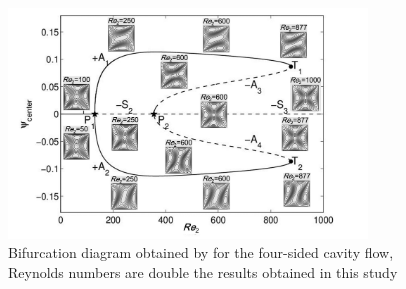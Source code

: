 \begin{figure}[h!]
  \centering
  \includegraphics[width=0.85\textwidth]{figs/fig2_chen2013.png}
  \caption{Bifurcation diagram obtained by \cite{chen2013} for the
   four-sided cavity flow, Reynolds numbers are 
    double the results obtained in this study} 
  \label{fig:bif_diag_chen}
\end{figure}

\vspace{100pt}

